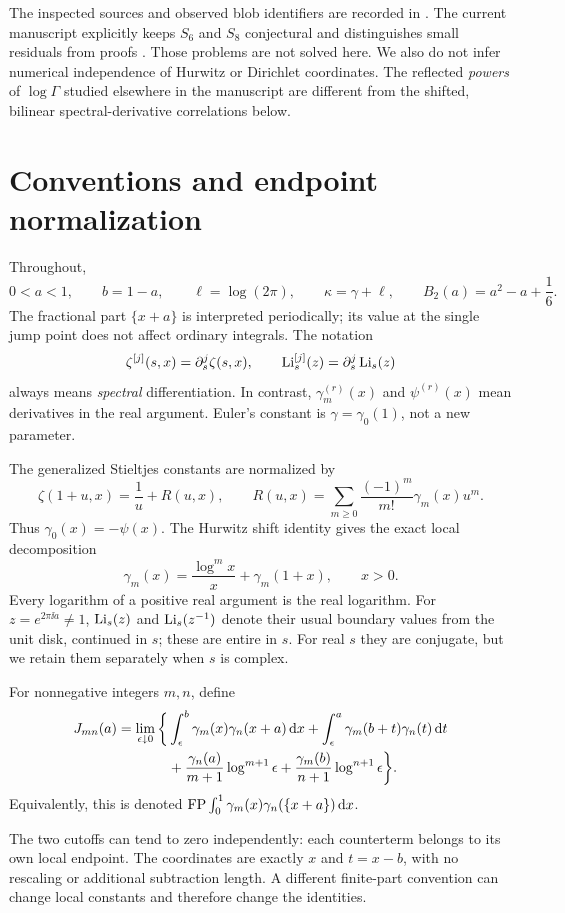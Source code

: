 The inspected sources and observed blob identifiers are recorded in . The current manuscript explicitly keeps $S_6$ and $S_8$ conjectural and distinguishes small residuals from proofs \cite{shj:repo}. Those problems are not solved here. We also do not infer numerical independence of Hurwitz or Dirichlet coordinates. The reflected \emph{powers} of $\log\Gamma$ studied elsewhere in the manuscript are different from the shifted, bilinear spectral-derivative correlations below.

\section{Conventions and endpoint normalization}\label{shj:conventions}
Throughout,
\[
0<a<1,\qquad b=1-a,\qquad \ell=\log(2\pi),\qquad
\kappa=\gamma+\ell,\qquad B_2(a)=a^2-a+\frac16.
\]
The fractional part $\{x+a\}$ is interpreted periodically; its value at the single jump point does not affect ordinary integrals. The notation
\[
\zeta^{[j]}(s,x)=\partial_s^j\zeta(s,x),\qquad
\operatorname{Li}_s^{[j]}(z)=\partial_s^j\operatorname{Li}_s(z)
\]
always means \emph{spectral} differentiation. In contrast, $\gamma_m^{(r)}(x)$ and $\psi^{(r)}(x)$ mean derivatives in the real argument. Euler's constant is $\gamma=\gamma_0(1)$, not a new parameter.

The generalized Stieltjes constants are normalized by
\begin{equation}\label{shj:laurent}
\zeta(1+u,x)=\frac1u+R(u,x),\qquad
R(u,x)=\sum_{m\ge0}\frac{(-1)^m}{m!}\gamma_m(x)u^m.
\end{equation}
Thus $\gamma_0(x)=-\psi(x)$. The Hurwitz shift identity gives the exact local decomposition
\begin{equation}\label{shj:localgamma}
\gamma_m(x)=\frac{\log^m x}{x}+\gamma_m(1+x),\qquad x>0.
\end{equation}
Every logarithm of a positive real argument is the real logarithm. For $z=e^{2\pi\ii a}\ne1$, $\operatorname{Li}_s(z)$ and $\operatorname{Li}_s(z^{-1})$ denote their usual boundary values from the unit disk, continued in $s$; these are entire in $s$. For real $s$ they are conjugate, but we retain them separately when $s$ is complex.

\begin{definition}\label{shj:defJ}
For nonnegative integers $m,n$, define
\begin{align}
J_{mn}(a)=\lim_{\epsilon\downarrow0}\bigg\{&
\int_\epsilon^b\gamma_m(x)\gamma_n(x+a)\,\mathrm{d} x
+\int_\epsilon^a\gamma_m(b+t)\gamma_n(t)\,\mathrm{d} t\notag\\
&+\frac{\gamma_n(a)}{m+1}\log^{m+1}\epsilon
+\frac{\gamma_m(b)}{n+1}\log^{n+1}\epsilon\bigg\}.
\label{shj:Jcutoff}
\end{align}
Equivalently, this is denoted
$\operatorname{FP}\int_0^1\gamma_m(x)\gamma_n(\{x+a\})\,\mathrm{d} x$.
\end{definition}
The two cutoffs can tend to zero independently: each counterterm belongs to its own local endpoint. The coordinates are exactly $x$ and $t=x-b$, with no rescaling or additional subtraction length. A different finite-part convention can change local constants and therefore change the identities.

